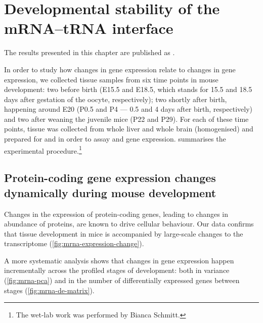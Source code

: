 \chapter{Developmental stability of the mRNA–tRNA interface}

The results presented in this chapter are published as \citet{Schmitt:2014}.



In order to study how changes in \mrna gene expression relate to changes in
\trna gene expression, we collected tissue samples from six time points in mouse
development: two before birth (E15.5 and E18.5, which stands for \num{15.5} and
\num{18.5} days after gestation of the oocyte, respectively); two shortly after
birth, happening around E20 (P0.5 and P4 --- \num{0.5} and \num{4} days after
birth, respectively) and two after weaning the juvenile mice (P22 and P29). For
each of these time points, tissue was collected from whole liver and whole brain
(homogenised) and prepared for \rnaseq and  \chipseq in order to assay
\mrna and \trna gene expression.  summarises the
experimental procedure.\footnote{The wet-lab work was performed by Bianca
Schmitt.}



\section{Protein-coding gene expression changes dynamically during mouse
development}

Changes in the expression of protein-coding genes, leading to changes in
abundance of proteins, are known to drive cellular behaviour. Our data
confirms that tissue development in mice is accompanied by large-scale changes
to the \mrna transcriptome (\cref{fig:mrna-expression-change}).

A more systematic analysis shows that changes in gene expression happen
incrementally across the profiled stages of development: both in variance
(\cref{fig:mrna-pca}) and in the number of differentially expressed genes
between stages (\cref{fig:mrna-de-matrix}).

